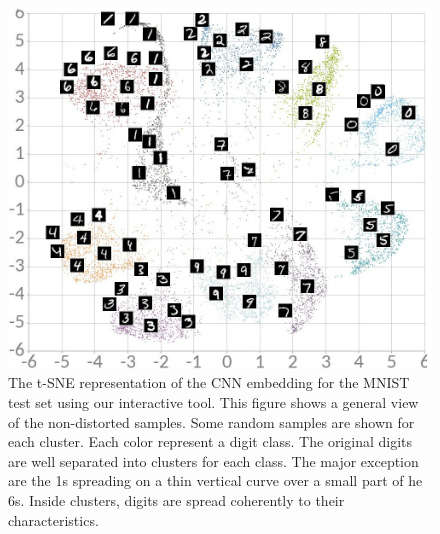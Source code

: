 \documentclass[a4paper,12pt]{report}
\begin{document}
\begin{figure}[t]
    \centering
    \includegraphics[width=\textwidth]{thesis_figures/mnist_nda_tsne.jpg}
    \caption{The t-SNE representation of the CNN embedding for the MNIST test set using our interactive tool.
    This figure shows a general view of the non-distorted samples.
    Some random samples are shown for each cluster.
    Each color represent a digit class.
    The original digits are well separated into clusters for each class.
    The major exception are the 1s spreading on a thin vertical curve over a small part of he 6s.
    Inside clusters, digits are spread coherently to their characteristics.
    }
    \label{fig:mnist_nda_tsne}
\end{figure}
\end{document}
